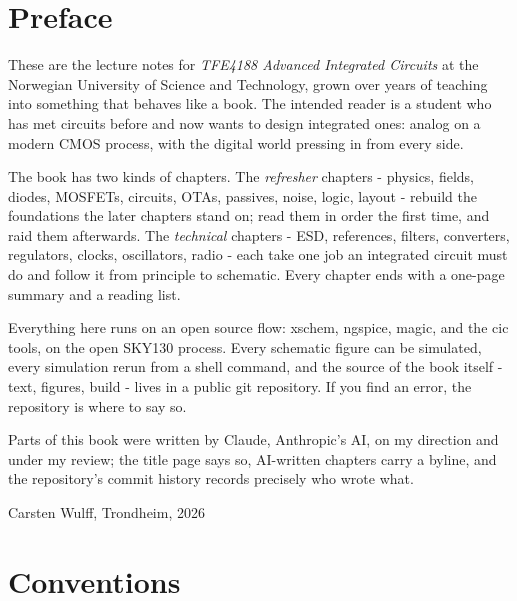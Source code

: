 

\chapter*{Preface}

These are the lecture notes for \emph{TFE4188 Advanced Integrated
Circuits} at the Norwegian University of Science and Technology, grown
over years of teaching into something that behaves like a book. The
intended reader is a student who has met circuits before and now wants
to design integrated ones: analog on a modern CMOS process, with the
digital world pressing in from every side.

The book has two kinds of chapters. The \emph{refresher} chapters -
physics, fields, diodes, MOSFETs, circuits, OTAs, passives, noise,
logic, layout - rebuild the foundations the later chapters stand on;
read them in order the first time, and raid them afterwards. The
\emph{technical} chapters - ESD, references, filters, converters,
regulators, clocks, oscillators, radio - each take one job an
integrated circuit must do and follow it from principle to schematic.
Every chapter ends with a one-page summary and a reading list.

Everything here runs on an open source flow: xschem, ngspice, magic,
and the cic tools, on the open SKY130 process. Every schematic figure
can be simulated, every simulation rerun from a shell command, and the
source of the book itself - text, figures, build - lives in a public
git repository. If you find an error, the repository is where to say
so.

Parts of this book were written by Claude, Anthropic's AI, on my
direction and under my review; the title page says so, AI-written
chapters carry a byline, and the repository's commit history records
precisely who wrote what.

\bigskip
\noindent Carsten Wulff, Trondheim, 2026

\chapter*{Conventions}

